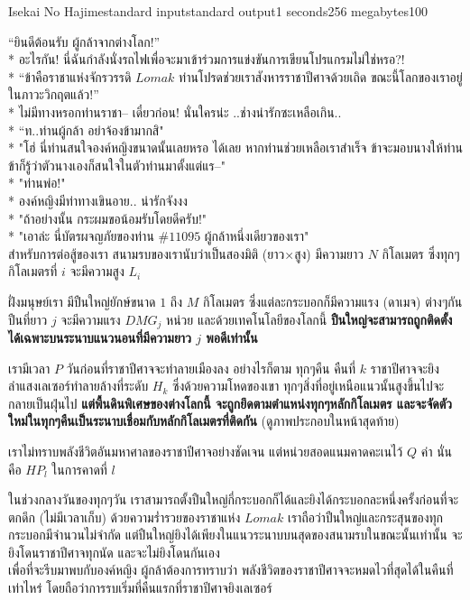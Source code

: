 \documentclass[11pt,a4paper]{article}
\begin{document}
\begin{problem}{Isekai No Hajime}{standard input}{standard output}{1 seconds}{256 megabytes}{100}

“ยินดีต้อนรับ ผู้กล้าจากต่างโลก!”\\*
อะไรกัน! นี่ฉันกำลังนั่งรถไฟเพื่อจะมาเข้าร่วมการแข่งขันการเขียนโปรแกรมไม่ใช่หรอ?!\\*
“ข้าคือราชาแห่งจักรวรรดิ $Lomak$ ท่านโปรดช่วยเราสังหารราชาปีศาจด้วยเถิด ขณะนี้โลกของเราอยู่ในภาวะวิกฤตแล้ว!”\\*
ไม่มีทางหรอกท่านราชา-- เดี๋ยวก่อน! นั่นใครน่ะ ..ช่างน่ารักซะเหลือเกิน..\\*
“ท..ท่านผู้กล้า อย่าจ้องข้ามากสิ"\\*
"โฮ่ นี่ท่านสนใจองค์หญิงขนาดนั้นเลยหรอ ได้เลย หากท่านช่วยเหลือเราสำเร็จ ข้าจะมอบนางให้ท่าน ข้าก็รู้ว่าตัวนางเองก็สนใจในตัวท่านมาตั้งแต่แร--"\\*
"ท่านพ่อ!"\\*
องค์หญิงมีท่าทางเขินอาย.. น่ารักจังงง\\*
"ถ้าอย่างนั้น กระผมขอน้อมรับโดยดีครับ!"\\*
"เอาล่ะ นี่บัตรผจญภัยของท่าน $\#11095$ ผู้กล้าหนึ่งเดียวของเรา"\\

สำหรับการต่อสู้ของเรา สนามรบของเรานับว่าเป็นสองมิติ (ยาว×สูง) มีความยาว $N$ กิโลเมตร ซึ่งทุกๆกิโลเมตรที่ $i$ จะมีความสูง $L_i$\par
ฝั่งมนุษย์เรา มีปืนใหญ่ยักษ์ขนาด $1$ ถึง $M$ กิโลเมตร ซึ่งแต่ละกระบอกก็มีความแรง (ดาเมจ) ต่างๆกัน ปืนที่ยาว $j$ จะมีความแรง $DMG_j$ หน่วย และด้วยเทคโนโลยีของโลกนี้ \textbf{ปืนใหญ่จะสามารถถูกติดตั้งได้เฉพาะบนระนาบแนวนอนที่มีความยาว $j$ พอดีเท่านั้น} \par
เรามีเวลา $P$ วันก่อนที่ราชาปีศาจจะทำลายเมืองลง อย่างไรก็ตาม ทุกๆคืน คืนที่ $k$ ราชาปีศาจจะยิงลำแสงเลเซอร์ทำลายล้างที่ระดับ $H_k$ ซึ่งด้วยความโหดของเขา ทุกๆสิ่งที่อยู่เหนือแนวนั้นสูงขึ้นไปจะกลายเป็นฝุ่นไป \textbf{แต่พื้นดินพิเศษของต่างโลกนี้ จะถูกยึดตามตำแหน่งทุกๆหลักกิโลเมตร และจะจัดตัวใหม่ในทุกๆคืนเป็นระนาบเชื่อมกับหลักกิโลเมตรที่ติดกัน} (ดูภาพประกอบในหน้าสุดท้าย)\par
เราไม่ทราบพลังชีวิตอันมหาศาลของราชาปีศาจอย่างชัดเจน แต่หน่วยสอดแนมคาดคะเนไว้ $Q$ ค่า นั่นคือ $HP_l$ ในการคาดที่ $l$\par
ในช่วงกลางวันของทุกๆวัน เราสามารถตั้งปืนใหญ่กี่กระบอกก็ได้และยิงได้กระบอกละหนึ่งครั้งก่อนที่จะตกดึก (ไม่มีเวลาเก็บ) ด้วยความร่ำรวยของราชาแห่ง $Lomak$ เราถือว่าปืนใหญ่และกระสุนของทุกกระบอกมีจำนวนไม่จำกัด แต่ปืนใหญ่ยิงได้เพียงในแนวระนาบบนสุดของสนามรบในขณะนั้นเท่านั้น จะยิงโดนราชาปีศาจทุกนัด และจะไม่ยิงโดนกันเอง \\
เพื่อที่จะรีบมาพบกับองค์หญิง ผู้กล้าต้องการทราบว่า พลังชีวิตของราชาปีศาจจะหมดไวที่สุดได้ในคืนที่เท่าไหร่ โดยถือว่าการรบเริ่มที่คืนแรกที่ราชาปีศาจยิงเลเซอร์


\end{problem}
\end{document}
